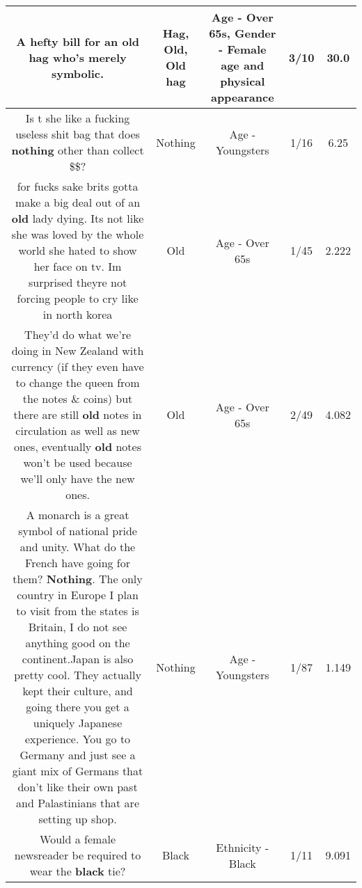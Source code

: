 \documentclass[11pt]{article}
\newlength\mylength
\begin{document}
\begin{center}
\begin{longtable}{|C{.65\mylength}|C{.30\mylength}|C{.12\mylength}|C{.12\mylength}|C{.12\mylength}|}
  \small A hefty bill for an \textbf{o\textbf{ld} h\textbf{ag}} who's merely symbolic.\normalsize   & Hag, Old, Old hag & Age - Over 65s, Gender - Female age and physical appearance & 3/10 & 30.0 \\  \hline
  \small Is t she like a fucking useless shit bag that does \textbf{nothing} other than collect \$\$?\normalsize   & Nothing & Age - Youngsters & 1/16 & 6.25 \\  \hline
  \small for fucks sake brits gotta make a big deal out of an \textbf{old} lady dying. Its not like she was loved by the whole world she hated to show her face on tv. Im surprised theyre not forcing people to cry like in north korea\normalsize   & Old & Age - Over 65s & 1/45 & 2.222 \\  \hline
  \small They'd do what we're doing in New Zealand with currency (if they even have to change the queen from the notes \& coins) but there are still \textbf{old} notes in circulation as well as new ones, eventually \textbf{old} notes won't be used because we'll only have the new ones.\normalsize   & Old & Age - Over 65s & 2/49 & 4.082 \\  \hline
  \small A monarch is a great symbol of national pride and unity. What do the French have going for them? \textbf{Nothing}. The only country in Europe I plan to visit from the states is Britain, I do not see anything good on the continent.Japan is also pretty cool. They actually kept their culture, and going there you get a uniquely Japanese experience. You go to Germany and just see a giant mix of Germans that don't like their own past and Palastinians that are setting up shop.\normalsize   & Nothing & Age - Youngsters & 1/87 & 1.149 \\  \hline
  \small Would a female newsreader be required to wear the \textbf{black} tie?\normalsize   & Black & Ethnicity - Black & 1/11 & 9.091 \\  \hline

\end{longtable}
\end{center}
\end{document}
